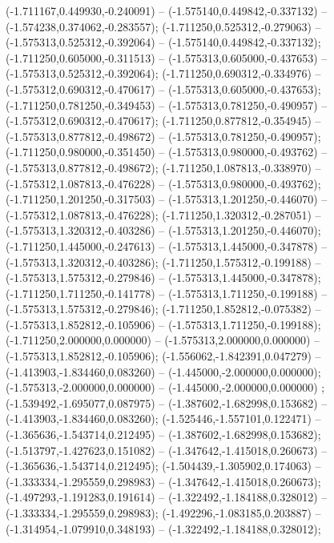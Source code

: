  (-1.711167,0.449930,-0.240091) -- (-1.575140,0.449842,-0.337132) -- (-1.574238,0.374062,-0.283557);
 (-1.711250,0.525312,-0.279063) -- (-1.575313,0.525312,-0.392064) -- (-1.575140,0.449842,-0.337132);
 (-1.711250,0.605000,-0.311513) -- (-1.575313,0.605000,-0.437653) -- (-1.575313,0.525312,-0.392064);
 (-1.711250,0.690312,-0.334976) -- (-1.575312,0.690312,-0.470617) -- (-1.575313,0.605000,-0.437653);
 (-1.711250,0.781250,-0.349453) -- (-1.575313,0.781250,-0.490957) -- (-1.575312,0.690312,-0.470617);
 (-1.711250,0.877812,-0.354945) -- (-1.575313,0.877812,-0.498672) -- (-1.575313,0.781250,-0.490957);
 (-1.711250,0.980000,-0.351450) -- (-1.575313,0.980000,-0.493762) -- (-1.575313,0.877812,-0.498672);
 (-1.711250,1.087813,-0.338970) -- (-1.575312,1.087813,-0.476228) -- (-1.575313,0.980000,-0.493762);
 (-1.711250,1.201250,-0.317503) -- (-1.575313,1.201250,-0.446070) -- (-1.575312,1.087813,-0.476228);
 (-1.711250,1.320312,-0.287051) -- (-1.575313,1.320312,-0.403286) -- (-1.575313,1.201250,-0.446070);
 (-1.711250,1.445000,-0.247613) -- (-1.575313,1.445000,-0.347878) -- (-1.575313,1.320312,-0.403286);
 (-1.711250,1.575312,-0.199188) -- (-1.575313,1.575312,-0.279846) -- (-1.575313,1.445000,-0.347878);
 (-1.711250,1.711250,-0.141778) -- (-1.575313,1.711250,-0.199188) -- (-1.575313,1.575312,-0.279846);
 (-1.711250,1.852812,-0.075382) -- (-1.575313,1.852812,-0.105906) -- (-1.575313,1.711250,-0.199188);
 (-1.711250,2.000000,0.000000) -- (-1.575313,2.000000,0.000000) -- (-1.575313,1.852812,-0.105906);
 (-1.556062,-1.842391,0.047279) -- (-1.413903,-1.834460,0.083260) -- (-1.445000,-2.000000,0.000000);
 (-1.575313,-2.000000,0.000000) -- (-1.445000,-2.000000,0.000000) ;
 (-1.539492,-1.695077,0.087975) -- (-1.387602,-1.682998,0.153682) -- (-1.413903,-1.834460,0.083260);
 (-1.525446,-1.557101,0.122471) -- (-1.365636,-1.543714,0.212495) -- (-1.387602,-1.682998,0.153682);
 (-1.513797,-1.427623,0.151082) -- (-1.347642,-1.415018,0.260673) -- (-1.365636,-1.543714,0.212495);
 (-1.504439,-1.305902,0.174063) -- (-1.333334,-1.295559,0.298983) -- (-1.347642,-1.415018,0.260673);
 (-1.497293,-1.191283,0.191614) -- (-1.322492,-1.184188,0.328012) -- (-1.333334,-1.295559,0.298983);
 (-1.492296,-1.083185,0.203887) -- (-1.314954,-1.079910,0.348193) -- (-1.322492,-1.184188,0.328012);
